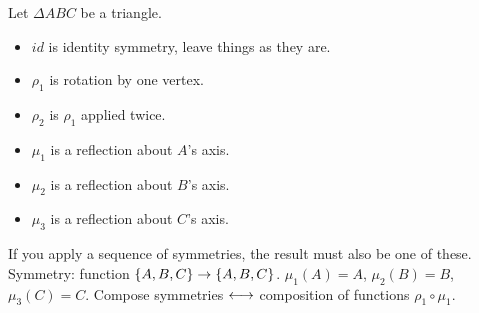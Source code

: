 \documentclass[]{article}
\begin{document}
\begin{example}
	[Triangle] Let $\Delta ABC$ be a triangle.
	\begin{itemize}
		\item $id$ is identity symmetry, leave things as they are.
		\item $\rho_1$ is rotation by one vertex.
		\item $\rho_2$ is $\rho_1$ applied twice.
		\item $\mu_1$ is a reflection about $A$'s axis.
		\item $\mu_2$ is a reflection about $B$'s axis.
		\item $\mu_3$ is a reflection about $C$'s axis.
	\end{itemize}
	If you apply a sequence of symmetries, the result must also be one of these.
	Symmetry: function $\{A,B,C\}\rightarrow\{A,B,C\}$.
	$\mu_1(A) = A$, $\mu_2(B) = B$, $\mu_3(C) = C$.
	Compose symmetries $\longleftrightarrow$ composition of functions $\rho_1\circ \mu _1$.


\end{example}
\end{document}
